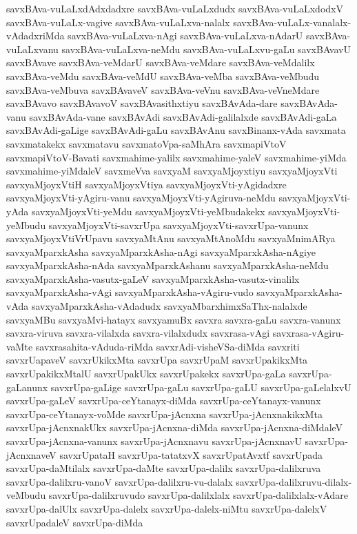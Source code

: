 {savxBAva-vuLaLxdAdxdadxre
savxBAva-vuLaLxdudx
savxBAva-vuLaLxdodxV
savxBAva-vuLaLx-vagive
savxBAva-vuLaLxva-nalalx
savxBAva-vuLaLx-vanalalx-vAdadxriMda
savxBAva-vuLaLxva-nAgi
savxBAva-vuLaLxva-nAdarU
savxBAva-vuLaLxvanu
savxBAva-vuLaLxva-neMdu
savxBAva-vuLaLxvu-gaLu
savxBAvavU
savxBAvave
savxBAva-veMdarU
savxBAva-veMdare
savxBAva-veMdalilx
savxBAva-veMdu
savxBAva-veMdU
savxBAva-veMba
savxBAva-veMbudu
savxBAva-veMbuva
savxBAvaveV
savxBAva-veVnu
savxBAva-veVneMdare
savxBAvavo
savxBAvavoV
savxBAvasithxtiyu
savxBAvAda-dare
savxBAvAda-vanu
savxBAvAda-vane
savxBAvAdi
savxBAvAdi-galilalxde
savxBAvAdi-gaLa
savxBAvAdi-gaLige
savxBAvAdi-gaLu
savxBAvAnu
savxBinanx-vAda
savxmata
savxmatakekx
savxmatavu
savxmatoVpa-saMhAra
savxmapiVtoV
savxmapiVtoV-Bavati
savxmahime-yalilx
savxmahime-yaleV
savxmahime-yiMda
savxmahime-yiMdaleV
savxmeVva
savxyaM
savxyaMjoyxtiyu
savxyaMjoyxVti
savxyaMjoyxVtiH
savxyaMjoyxVtiya
savxyaMjoyxVti-yAgidadxre
savxyaMjoyxVti-yAgiru-vanu
savxyaMjoyxVti-yAgiruva-neMdu
savxyaMjoyxVti-yAda
savxyaMjoyxVti-yeMdu
savxyaMjoyxVti-yeMbudakekx
savxyaMjoyxVti-yeMbudu
savxyaMjoyxVti-savxrUpa
savxyaMjoyxVti-savxrUpa-vanunx
savxyaMjoyxVtiVrUpavu
savxyaMtAnu
savxyaMtAnoMdu
savxyaMnimARya
savxyaMparxkAsha
savxyaMparxkAsha-nAgi
savxyaMparxkAsha-nAgiye
savxyaMparxkAsha-nAda
savxyaMparxkAshanu
savxyaMparxkAsha-neMdu
savxyaMparxkAsha-vasutx-gaLeV
savxyaMparxkAsha-vasutx-vinalilx
savxyaMparxkAsha-vAgi
savxyaMparxkAsha-vAgiru-vudo
savxyaMparxkAsha-vAda
savxyaMparxkAsha-vAdadudx
savxyaMbarxhimxSaThx-nalalxde
savxyaMBu
savxyaMvi-hatayx
savxyamuBx
savxra
savxra-gaLu
savxra-vanunx
savxra-viruva
savxra-vilalxda
savxra-vilalxdudx
savxrasa-vAgi
savxrasa-vAgiru-vaMte
savxrasahita-vAduda-riMda
savxrAdi-visheVSa-diMda
savxriti
savxrUapaveV
savxrUkikxMta
savxrUpa
savxrUpaM
savxrUpakikxMta
savxrUpakikxMtalU
savxrUpakUkx
savxrUpakekx
savxrUpa-gaLa
savxrUpa-gaLanunx
savxrUpa-gaLige
savxrUpa-gaLu
savxrUpa-gaLU
savxrUpa-gaLelalxvU
savxrUpa-gaLeV
savxrUpa-ceYtanayx-diMda
savxrUpa-ceYtanayx-vanunx
savxrUpa-ceYtanayx-voMde
savxrUpa-jAcnxna
savxrUpa-jAcnxnakikxMta
savxrUpa-jAcnxnakUkx
savxrUpa-jAcnxna-diMda
savxrUpa-jAcnxna-diMdaleV
savxrUpa-jAcnxna-vanunx
savxrUpa-jAcnxnavu
savxrUpa-jAcnxnavU
savxrUpa-jAcnxnaveV
savxrUpataH
savxrUpa-tatatxvX
savxrUpatAvxtf
savxrUpada
savxrUpa-daMtilalx
savxrUpa-daMte
savxrUpa-dalilx
savxrUpa-dalilxruva
savxrUpa-dalilxru-vanoV
savxrUpa-dalilxru-vu-dalalx
savxrUpa-dalilxruvu-dilalx-veMbudu
savxrUpa-dalilxruvudo
savxrUpa-dalilxlalx
savxrUpa-dalilxlalx-vAdare
savxrUpa-dalUlx
savxrUpa-dalelx
savxrUpa-dalelx-niMtu
savxrUpa-dalelxV
savxrUpadaleV
savxrUpa-diMda
}
